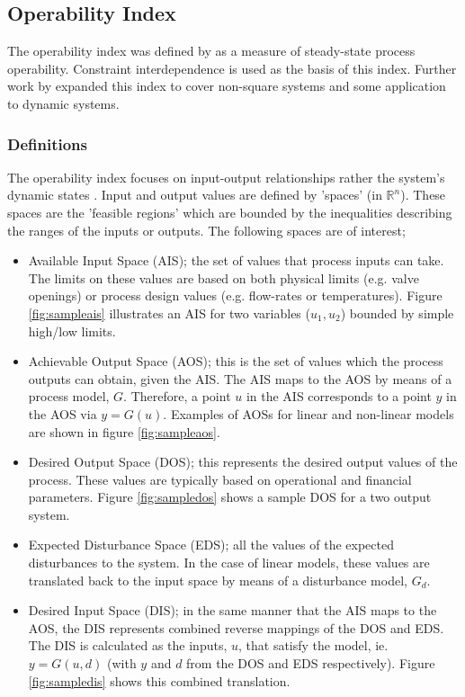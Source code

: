 \subsection{Operability Index}\label{sec:oi}
The operability index was defined by \citet{vinsonphd} as a measure of steady-state process operability. 
Constraint interdependence is used as the basis of this index. 
Further work by \citet{limaphd} expanded this index to cover non-square systems and some application to dynamic systems.
\subsubsection{Definitions}
The operability index focuses on input-output relationships rather the system's dynamic states \citep{vinsonphd}. 
Input and output values are defined by 'spaces' (in $\mathbb{R}^n$). 
These spaces are the 'feasible regions' which are bounded by the inequalities describing the ranges of the inputs or outputs. 
The following spaces are of interest;
\begin{itemize}
  \item Available Input Space (AIS); the set of values that process      inputs can take. 
    The limits on these values are based on both physical limits (e.g.     valve openings) or process design values (e.g. flow-rates or temperatures). 
Figure \ref{fig:sampleais} illustrates an AIS for two variables ($u_1, u_2$) bounded by simple high/low limits.
  \item Achievable Output Space (AOS); this is the set of values which the process outputs can obtain, given the AIS. 
The AIS maps to the AOS by means of a process model, $G$. 
Therefore, a point $u$ in the AIS corresponds to a point $y$ in the AOS via $y=G(u)$. 
Examples of AOSs for linear and non-linear models are shown in figure \ref{fig:sampleaos}.
  \item Desired Output Space (DOS); this represents the desired output values of the process. 
These values are typically based on operational and financial   parameters. 
Figure \ref{fig:sampledos} shows a sample DOS for a two output    system.
  \item Expected Disturbance Space (EDS); all the values of the expected disturbances to the system. 
In the case of linear models, these values are translated back to the input space by means of a disturbance model, $G_d$.
  \item Desired Input Space (DIS); in the same manner that the AIS maps to the AOS, the DIS represents combined reverse mappings of the DOS and EDS.
The DIS is calculated as the inputs, $u$, that satisfy the model, ie. $y=G(u,d)$ (with $y$ and $d$ from the DOS and EDS respectively).
Figure \ref{fig:sampledis} shows this combined translation.
\end{itemize}

